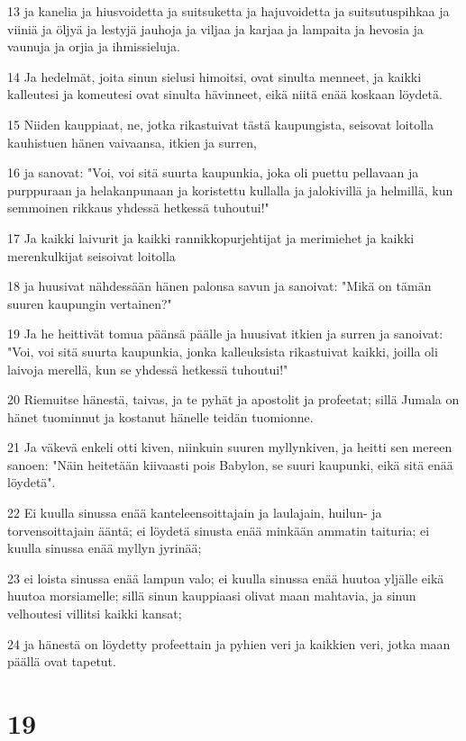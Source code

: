 \par 13 ja kanelia ja hiusvoidetta ja suitsuketta ja hajuvoidetta ja suitsutuspihkaa ja viiniä ja öljyä ja lestyjä jauhoja ja viljaa ja karjaa ja lampaita ja hevosia ja vaunuja ja orjia ja ihmissieluja.
\par 14 Ja hedelmät, joita sinun sielusi himoitsi, ovat sinulta menneet, ja kaikki kalleutesi ja komeutesi ovat sinulta hävinneet, eikä niitä enää koskaan löydetä.
\par 15 Niiden kauppiaat, ne, jotka rikastuivat tästä kaupungista, seisovat loitolla kauhistuen hänen vaivaansa, itkien ja surren,
\par 16 ja sanovat: "Voi, voi sitä suurta kaupunkia, joka oli puettu pellavaan ja purppuraan ja helakanpunaan ja koristettu kullalla ja jalokivillä ja helmillä, kun semmoinen rikkaus yhdessä hetkessä tuhoutui!"
\par 17 Ja kaikki laivurit ja kaikki rannikkopurjehtijat ja merimiehet ja kaikki merenkulkijat seisoivat loitolla
\par 18 ja huusivat nähdessään hänen palonsa savun ja sanoivat: "Mikä on tämän suuren kaupungin vertainen?"
\par 19 Ja he heittivät tomua päänsä päälle ja huusivat itkien ja surren ja sanoivat: "Voi, voi sitä suurta kaupunkia, jonka kalleuksista rikastuivat kaikki, joilla oli laivoja merellä, kun se yhdessä hetkessä tuhoutui!"
\par 20 Riemuitse hänestä, taivas, ja te pyhät ja apostolit ja profeetat; sillä Jumala on hänet tuominnut ja kostanut hänelle teidän tuomionne.
\par 21 Ja väkevä enkeli otti kiven, niinkuin suuren myllynkiven, ja heitti sen mereen sanoen: "Näin heitetään kiivaasti pois Babylon, se suuri kaupunki, eikä sitä enää löydetä".
\par 22 Ei kuulla sinussa enää kanteleensoittajain ja laulajain, huilun- ja torvensoittajain ääntä; ei löydetä sinusta enää minkään ammatin taituria; ei kuulla sinussa enää myllyn jyrinää;
\par 23 ei loista sinussa enää lampun valo; ei kuulla sinussa enää huutoa yljälle eikä huutoa morsiamelle; sillä sinun kauppiaasi olivat maan mahtavia, ja sinun velhoutesi villitsi kaikki kansat;
\par 24 ja hänestä on löydetty profeettain ja pyhien veri ja kaikkien veri, jotka maan päällä ovat tapetut.

\chapter{19}

